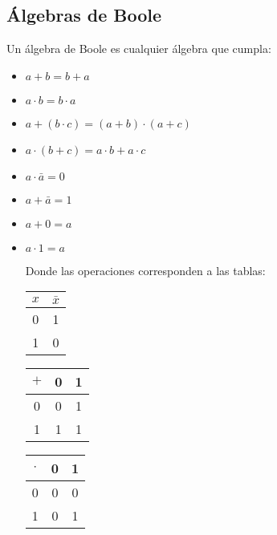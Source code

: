 \documentclass[a4paper]{article}
\begin{document}
\subsection{Álgebras de Boole}
Un álgebra de Boole es cualquier álgebra que cumpla:
\begin{itemize}
\item $a+b=b+a$
\item $a\cdot b=b\cdot a$
\item $a+(b\cdot c)=(a+b)\cdot(a+c)$
\item $a\cdot(b+c)=a\cdot b+a\cdot c$
\item $a\cdot\bar{a}=0$
\item $a+\bar{a}=1$
\item $a+0=a$
\item $a\cdot 1=a$

Donde las operaciones corresponden a las tablas:
\begin{table}[H]
\begin{tabular}{|c|c|}
\hline
$x$ & $\bar{x}$ \\
\hline
0 & 1 \\
\hline
1 &  0\\
\hline
\end{tabular}
\end{table}
\begin{table}[H]
\begin{tabular}{|c|c|c|}
\hline
$+$ & 0 & 1 \\
\hline
0 & 0 & 1 \\
\hline
1 & 1 & 1 \\
\hline
\end{tabular}
\end{table}
\begin{table}[H]
\begin{tabular}{|c|c|c|}
\hline
$\cdot$ & 0 & 1 \\
\hline
0 & 0 & 0 \\
\hline
1 & 0 & 1 \\
\hline
\end{tabular}
\end{table}
\end{itemize}
\end{document}
